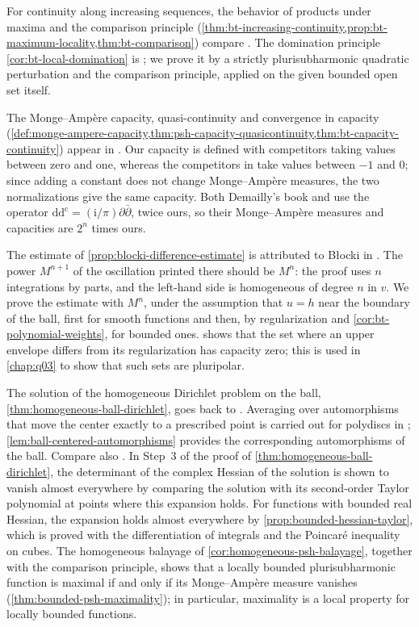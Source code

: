 For continuity along increasing sequences, the behavior of products under maxima and the comparison principle (\cref{thm:bt-increasing-continuity,prop:bt-maximum-locality,thm:bt-comparison}) compare \cite[Theorem 3.23, and Theorems 3.27 and 3.29]{GZ17}. The domination principle \cref{cor:bt-local-domination} is \cite[Proposition~1.2.10]{XiaSampleBook}; we prove it by a strictly plurisubharmonic quadratic perturbation and the comparison principle, applied on the given bounded open set itself.

The Monge--Amp\`ere capacity, quasi-continuity and convergence in capacity (\cref{def:monge-ampere-capacity,thm:psh-capacity-quasicontinuity,thm:bt-capacity-continuity}) appear in \cite[Proposition 4.19, Theorem 4.20 and Lemma 4.21, and Theorem 4.26]{GZ17}. Our capacity is defined with competitors taking values between zero and one, whereas the competitors in \cite[Definition 4.16]{GZ17} take values between $-1$ and $0$; since adding a constant does not change Monge--Amp\`ere measures, the two normalizations give the same capacity. Both Demailly's book and \cite{GZ17} use the operator $\mathrm{dd^c}=(\mathrm{i}/\pi)\partial\bar\partial$, twice ours, so their Monge--Amp\`ere measures and capacities are $2^n$ times ours.

The estimate of \cref{prop:blocki-difference-estimate} is attributed to B\l{}ocki in \cite[Proposition 3.21]{GZ17}. The power $M^{n+1}$ of the oscillation printed there should be $M^n$: the proof uses $n$ integrations by parts, and the left-hand side is homogeneous of degree $n$ in $v$. We prove the estimate with $M^n$, under the assumption that $u=h$ near the boundary of the ball, first for smooth functions and then, by regularization and \cref{cor:bt-polynomial-weights}, for bounded ones.  shows that the set where an upper envelope differs from its regularization has capacity zero; this is used in \cref{chap:q03} to show that such sets are pluripolar.

The solution of the homogeneous Dirichlet problem on the ball, \cref{thm:homogeneous-ball-dirichlet}, goes back to \cite{BT76}. Averaging over automorphisms that move the center exactly to a prescribed point is carried out for polydiscs in \cite[Section 2.3, Theorem 2.3.2 and Proposition 2.3.3]{Blo02Pluripotential}; \cref{lem:ball-centered-automorphisms} provides the corresponding automorphisms of the ball. Compare also \cite[Theorems 5.13--5.14]{GZ17}. In Step~3 of the proof of \cref{thm:homogeneous-ball-dirichlet}, the determinant of the complex Hessian of the solution is shown to vanish almost everywhere by comparing the solution with its second-order Taylor polynomial at points where this expansion holds. For functions with bounded real Hessian, the expansion holds almost everywhere by \cref{prop:bounded-hessian-taylor}, which is proved with the differentiation of integrals and the Poincar\'e inequality on cubes. The homogeneous balayage of \cref{cor:homogeneous-psh-balayage}, together with the comparison principle, shows that a locally bounded plurisubharmonic function is maximal if and only if its Monge--Amp\`ere measure vanishes (\cref{thm:bounded-psh-maximality}); in particular, maximality is a local property for locally bounded functions.

